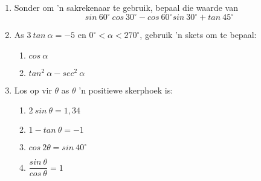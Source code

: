 \begin{eocexercises}{}
\begin{enumerate}[itemsep=6pt, label=\textbf{\arabic*}. ] 
\item Sonder om 'n sakrekenaar te gebruik, bepaal die waarde van
\begin{equation*}
sin~60^{\circ}~cos~30^{\circ}-cos~60^{\circ}sin~30^{\circ} + tan~45^{\circ}
\end{equation*}
\item As $3~tan~\alpha = -5$ en $0^{\circ} < \alpha < 270^{\circ}$, gebruik 'n skets om te bepaal:
    \begin{enumerate}[noitemsep, label=\textbf{(\alph*)} ]
    \item $cos~\alpha$
    \item $tan^{2}~\alpha - sec^{2}~\alpha$
    \end{enumerate}
\item Los op vir $\theta$ as $\theta$ 'n positiewe skerphoek is:
    \begin{enumerate}[noitemsep, label=\textbf{(\alph*)} ]
    \item $2~sin~\theta = 1,34$
    \item $1 - tan~\theta = -1$
    \item $cos~2\theta = sin~40^{\circ}$ 
    \item $\dfrac{sin~\theta}{cos~\theta}= 1$
    \end{enumerate}



\end{enumerate}
\end{eocexercises}
